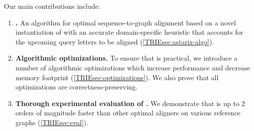 \begin{samepage}
Our main contributions include:
	
\begin{enumerate}
	\item \textbf{\astarix.} An algorithm for optimal sequence-to-graph
	alignment based on a novel instantiation of \A with an accurate
	domain-specific heuristic that accounts for the upcoming query letters to be
	aligned (\cref{TRIEsec:astarix-algo}).
	\item \textbf{Algorithmic optimizations.}
	To ensure that \astarix is practical, we introduce a number of algorithmic
	optimizations which increase performance and decrease memory footprint
	(\cref{TRIEsec:optimizations}). We also prove that all optimizations are
	correctness-preserving.
	\item \textbf{Thorough experimental evaluation of \astarix.}
	We demonstrate that \astarix is up to 2 orders of magnitude faster than
	other optimal aligners on various reference graphs (\cref{TRIEsec:eval}).
\end{enumerate}
\end{samepage}
